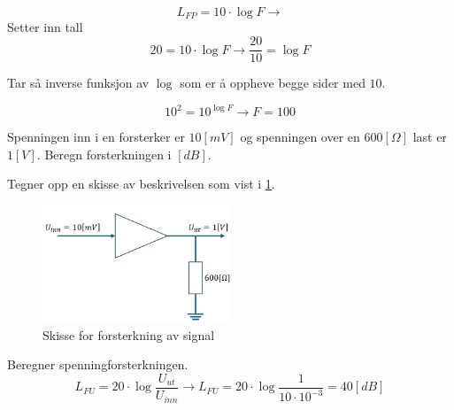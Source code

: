 \begin{solution}[name=Løsningsforslag oppgave]
\[L_{FP}=10 \cdot \log F \rightarrow \]
Setter inn tall
\[20=10 \cdot \log F \rightarrow \frac{20}{10}= \log F\]

Tar så inverse funksjon av $ \log $ som er å oppheve begge sider med $10$.

\[10^2=10^{\log F} \rightarrow F=100\]

\end{solution}


\vspace{0.5cm} %

\begin{question}[name=Oppgave, topic=forsterkning]
Spenningen inn i en forsterker er $10[mV]$ og spenningen over en $600[\Omega]$ last er $1[V]$. Beregn forsterkningen i $[dB]$.
\end{question}

\vspace{0.5cm} %

\begin{solution}[name=Løsningsforslag oppgave]
Tegner opp en skisse av beskrivelsen som vist i \ref{fig:forsterk2}.
	\begin{figure}[H]
		\centering
		\includegraphics[width=0.5\textwidth]{forsterkning/figurer/forsterkningxLOS.png}
		\caption{Skisse for forsterkning av signal}
		\label{fig:forsterk2}
	\end{figure}

	Beregner spenningforsterkningen.
\[L_{FU} = 20 \cdot \log \frac{U_{ut}}{U_{inn}} \rightarrow L_{FU}=20 \cdot \log \frac{1}{10 \cdot 10 ^{-3}}= 40 [dB]\]

\end{solution}


\vspace{0.5cm} %


